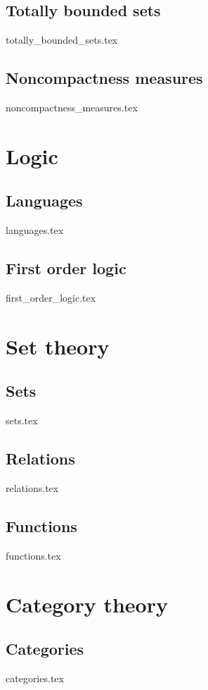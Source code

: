\documentclass[numbers=endperiod, bibliography=totocnumbered]{scrartcl}
\begin{document}
\subsection{Totally bounded sets}\label{sec:totally_bounded_sets}
{totally_bounded_sets.tex}
\subsection{Noncompactness measures}\label{sec:noncompactness_measures}
{noncompactness_measures.tex}

\section{Logic}\label{sec:logic}
\subsection{Languages}\label{sec:languages}
{languages.tex}
\subsection{First order logic}\label{sec:first_order_logic}
{first_order_logic.tex}

\section{Set theory}\label{sec:set_theory}
\subsection{Sets}\label{sec:sets}
{sets.tex}
\subsection{Relations}\label{sec:relations}
{relations.tex}
\subsection{Functions}\label{sec:functions}
{functions.tex}

\section{Category theory}\label{sec:category_theory}
\subsection{Categories}\label{sec:categories}
{categories.tex}
\end{document}
